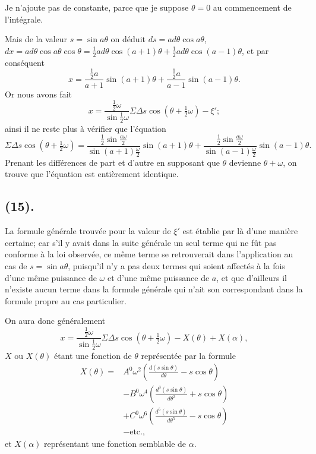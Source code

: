 \documentclass{article}
\begin{document}
Je n'ajoute pas de constante, parce que je suppose $\theta=0$ au commencement de l'intégrale.

Mais de la valeur $s=\sin a\theta$ on déduit $ds=ad\theta\cos a\theta$, $dx=ad\theta\cos a\theta\cos\theta=\frac{1}{2}ad\theta\cos(a+1)\theta+\frac{1}{2}ad\theta\cos(a-1)\theta$, et par conséquent
\[ x=\frac{\frac{1}{2}a}{a+1}\sin(a+1)\theta+\frac{\frac{1}{2}a}{a-1}\sin(a-1)\theta. \]
Or nous avons fait
\[ x=\frac{\frac{1}{2}\omega}{\sin\frac{1}{2}\omega}\Sigma\Delta s\cos(\theta+\tfrac{1}{2}\omega)-\xi'; \]
ainsi il ne reste plus à vérifier que l'équation
\[ \Sigma\Delta s\cos(\theta+\tfrac{1}{2}\omega)=\frac{\frac{1}{2}\sin\frac{a\omega}{2}}{\sin(a+1)\frac{\omega}{2}}\sin(a+1)\theta+\frac{\frac{1}{2}\sin\frac{a\omega}{2}}{\sin(a-1)\frac{\omega}{2}}\sin(a-1)\theta. \]
Prenant les différences de part et d'autre en supposant que $\theta$ devienne $\theta+\omega$, on trouve que l'équation est entièrement identique.

\subsection*{(15).}

La formule générale trouvée pour la valeur de $\xi'$ est établie par là d'une manière certaine; car s'il y avait dans la suite générale un seul terme qui ne fût pas conforme à la loi observée, ce même terme se retrouverait dans l'application au cas de $s=\sin a\theta$, puisqu'il n'y a pas deux termes qui soient affectés à la fois d'une même puissance de $\omega$ et d'une même puissance de $a$, et que d'ailleurs il n'existe aucun terme dans la formule générale qui n'ait son correspondant dans la formule propre au cas particulier.

On aura donc généralement
\[ x=\frac{\frac{1}{2}\omega}{\sin\frac{1}{2}\omega}\Sigma\Delta s\cos(\theta+\tfrac{1}{2}\omega)-X(\theta)+X(\alpha), \]
$X$ ou $X(\theta)$ étant une fonction de $\theta$ représentée par la formule
\[ \begin{aligned} X(\theta)={}&A^{0}\omega^{2}\left(\frac{d(s\sin\theta)}{d\theta}-s\cos\theta\right)\\ &-B^{0}\omega^{4}\left(\frac{d^{3}(s\sin\theta)}{d\theta^{3}}+s\cos\theta\right)\\ &+C^{0}\omega^{6}\left(\frac{d^{5}(s\sin\theta)}{d\theta^{5}}-s\cos\theta\right)\\ &-\text{etc.}, \end{aligned} \]
et $X(\alpha)$ représentant une fonction semblable de $\alpha$.
\end{document}
